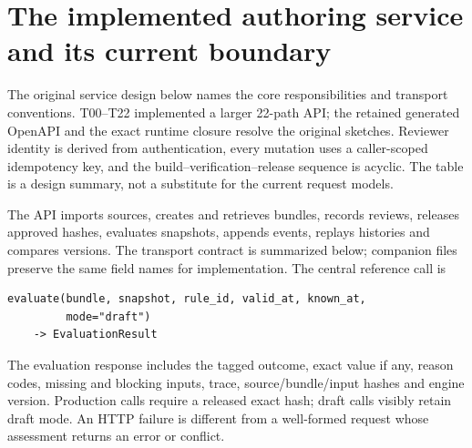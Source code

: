 \documentclass[12pt,a4paper,oneside,openany]{book}
\begin{document}
\section{The implemented authoring service and its current boundary}

The original service design below names the core responsibilities and transport
conventions. T00--T22 implemented a larger 22-path API; the retained generated
OpenAPI and the exact runtime closure resolve the original sketches. Reviewer
identity is derived from authentication, every mutation uses a caller-scoped
idempotency key, and the build--verification--release sequence is acyclic.
The table is a design summary, not a substitute for the current request models.


\label{merge:P-03c-storage-review:02}


The API imports sources, creates and retrieves bundles, records reviews, releases
approved hashes, evaluates snapshots, appends events, replays histories and
compares versions. The transport contract is summarized below; companion files
preserve the same field names for implementation. The central reference call is

\begin{minipage}{\textwidth}
\begin{lstlisting}
evaluate(bundle, snapshot, rule_id, valid_at, known_at,
         mode="draft")
    -> EvaluationResult
\end{lstlisting}
\end{minipage}

The evaluation response includes the tagged outcome, exact value if any, reason codes,
missing and blocking inputs, trace, source/bundle/input hashes and engine version.
Production calls require a released exact hash; draft calls visibly retain draft
mode. An HTTP failure is different from a well-formed request whose assessment
returns an error or conflict.
\end{document}
